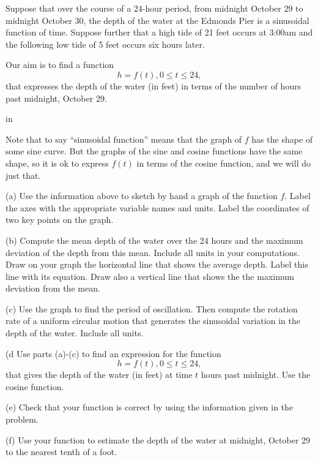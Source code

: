\documentclass{ximera}
\newcommand{\pskip}{\vskip 0.1 in}
\begin{document}
\begin{example} \label{Ex4:Graphs}
Suppose that over the course of a 24-hour period, from midnight October 29 to midnight October 30, the depth of the water at the Edmonds Pier is a sinusoidal function of time. Suppose further that a high tide of 21 feet occurs at 3:00am and the following low tide of 5 feet occurs six hours later. 

Our aim is to find a function
\[
    h = f(t) , 0\leq t \leq 24, 
\]
that expresses the depth of the water (in feet) in terms of the number of hours past midnight, October 29. 

\pskip

Note that to say ``sinusoidal function'' means that the graph of $f$ has the shape of some sine curve. But the graphs of the sine and cosine functions have the same shape, so it is ok to express $f(t)$ in terms of the cosine function, and we will do just that.



(a) Use the information above to sketch by hand a graph of the function $f$. Label the axes with the appropriate variable names and units. Label the coordinates of two key points on the graph.

(b) Compute the mean depth of the water over the 24 hours and the maximum deviation of the depth from this mean. Include all units in your computations. Draw on your graph the horizontal line that shows the average depth. Label this line with its equation. Draw also a vertical line that shows the the maximum deviation from the mean.

(c) Use the graph to find the period of oscillation. Then compute the rotation rate of a uniform circular motion that generates the sinusoidal variation in the depth of the water. Include all units.

(d Use parts (a)-(c) to find an expression for the function 
\[
   h = f(t) ,  0\leq t \leq 24, 
\]
that gives the depth of the water (in feet) at time $t$ hours past midnight. Use the cosine function.

(e) Check that your function is correct by using the information given in the problem.

(f) Use your function to estimate the depth of the water at midnight, October 29 to the nearest tenth of a foot.


\end{example}
\end{document}
